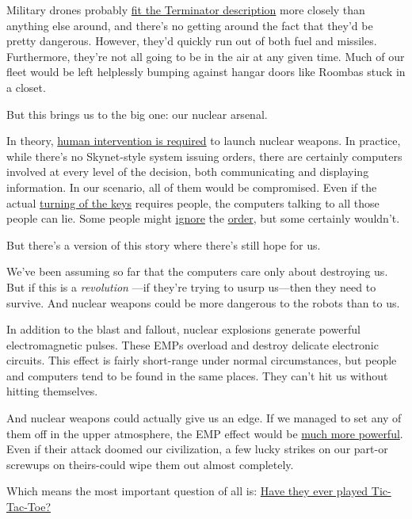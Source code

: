 {Military drones probably \href{http://xkcd.com/652/}{fit the Terminator description} more closely than anything else around, and there’s no getting around the fact that they’d be pretty dangerous. However, they’d quickly run out of both fuel and missiles. Furthermore, they’re not all going to be in the air at any given time. Much of our fleet would be left helplessly bumping against hangar doors like Roombas stuck in a closet.}

{But this brings us to the big one: our nuclear arsenal.}

{In theory, \href{http://articles.chicagotribune.com/1999-11-11/news/9911110121\_1\_nuclear-weapons-y2k-launch}{human intervention is required} to launch nuclear weapons. In practice, while there’s no Skynet-style system issuing orders, there are certainly computers involved at every level of the decision, both communicating and displaying information. In our scenario, all of them would be compromised. Even if the actual \href{http://en.wikipedia.org/wiki/Two-man\_rule\#Nuclear\_weapons}{turning of the keys} requires people, the computers talking to all those people can lie. Some people might \href{http://en.wikipedia.org/wiki/Vasiliy\_Arkhipov\#Cuban\_Missile\_Crisis}{ignore} the \href{http://en.wikipedia.org/wiki/Stanislav\_Petrov} {order}, but some certainly wouldn’t.}

{But there’s a version of this story where there’s still hope for us.}

{We’ve been assuming so far that the computers care only about destroying us. But if this is a \emph{revolution} —if they’re trying to usurp us—then they need to survive. And nuclear weapons could be more dangerous to the robots than to us.}

{In addition to the blast and fallout, nuclear explosions generate powerful electromagnetic pulses. These EMPs overload and destroy delicate electronic circuits. This effect is fairly short-range under normal circumstances, but people and computers tend to be found in the same places. They can’t hit us without hitting themselves.}

{And nuclear weapons could actually give us an edge. If we managed to set any of them off in the upper atmosphere, the EMP effect would be \href{http://en.wikipedia.org/wiki/The\_K\_Project}{much more powerful}. Even if their attack doomed our civilization, a few lucky strikes on our part-or screwups on theirs-could wipe them out almost completely.}

{Which means the most important question of all is: \href{http://www.youtube.com/watch?v=NHWjlCaIrQo}{Have they ever played Tic-Tac-Toe?}}


